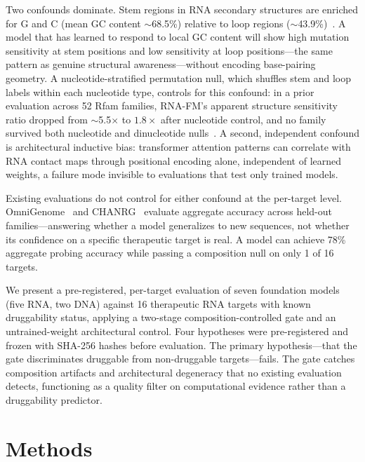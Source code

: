 \documentclass[11pt]{article}
\begin{document}
Two confounds dominate. Stem regions in RNA secondary structures are enriched
for G and C (mean GC content $\sim$68.5\%) relative to loop regions
($\sim$43.9\%)~\citep{towerC2026}. A model that has learned to respond to
local GC content will show high mutation sensitivity at stem positions and
low sensitivity at loop positions---the same pattern as genuine structural
awareness---without encoding base-pairing geometry. A nucleotide-stratified
permutation null, which shuffles stem and loop labels within each nucleotide
type, controls for this confound: in a prior evaluation across 52 Rfam
families, RNA-FM's apparent structure sensitivity ratio dropped from
$\sim$5.5$\times$ to $1.8\times$ after nucleotide control, and no family
survived both nucleotide and dinucleotide nulls~\citep{towerC2026}. A second,
independent confound is architectural inductive bias: transformer attention
patterns can correlate with RNA contact maps through positional encoding
alone, independent of learned weights, a failure mode invisible to
evaluations that test only trained models.

Existing evaluations do not control for either confound at the per-target
level. OmniGenome~\citep{omnigenome2024} and CHANRG~\citep{chanrg2026}
evaluate aggregate accuracy across held-out families---answering whether a
model generalizes to new sequences, not whether its confidence on a specific
therapeutic target is real. A model can achieve 78\% aggregate probing
accuracy while passing a composition null on only 1 of 16 targets.

We present a pre-registered, per-target evaluation of seven foundation
models (five RNA, two DNA) against 16 therapeutic RNA targets with known
druggability status, applying a two-stage composition-controlled gate and an
untrained-weight architectural control. Four hypotheses were pre-registered
and frozen with SHA-256 hashes before evaluation. The primary
hypothesis---that the gate discriminates druggable from non-druggable
targets---fails. The gate catches composition artifacts and architectural
degeneracy that no existing evaluation detects, functioning as a quality
filter on computational evidence rather than a druggability predictor.


\section{Methods}
\end{document}
